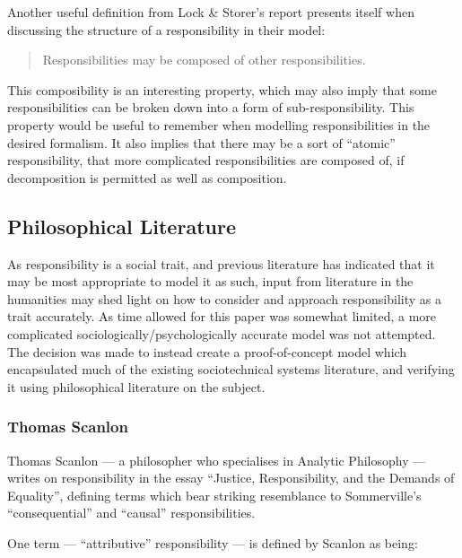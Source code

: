 Another useful definition from Lock \& Storer's report presents itself when discussing the structure of a responsibility in their model:

\begin{quotation}
    Responsibilities may be composed of other responsibilities.
\end{quotation}

This composibility is an interesting property, which may also imply that some responsibilities can be broken down into a form of sub-responsibility. This property would be useful to remember when modelling responsibilities in the desired formalism. It also implies that there may be a sort of ``atomic'' responsibility, that more complicated responsibilities are composed of, if decomposition is permitted as well as composition.\par

\subsection{Philosophical Literature}  %
As responsibility is a social trait, and previous literature has indicated that it may be most appropriate to model it as such, input from literature in the humanities may shed light on how to consider and approach responsibility as a trait accurately. As time allowed for this paper was somewhat limited, a more complicated sociologically/psychologically accurate model was not attempted. The decision was made to instead create a proof-of-concept model which encapsulated much of the existing sociotechnical systems literature, and verifying it using philosophical literature on the subject.

\subsubsection{Thomas Scanlon\cite{scanlon2006justice}}  %
Thomas Scanlon --- a philosopher who specialises in Analytic Philosophy --- writes on responsibility in the essay ``Justice, Responsibility, and the Demands of Equality'', defining terms which bear striking resemblance to Sommerville's ``consequential'' and ``causal'' responsibilities.\par

One term --- ``attributive'' responsibility --- is defined by Scanlon as being:

